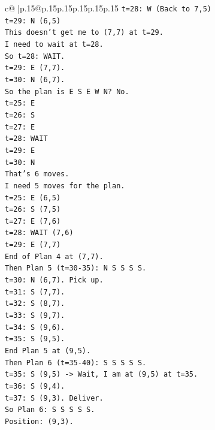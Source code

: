 \documentclass{article}
\begin{document}
{\begin{supertabular}{c@{$\;$}|p{.15\linewidth}@{}p{.15\linewidth}p{.15\linewidth}p{.15\linewidth}p{.15\linewidth}p{.15\linewidth}}
{{{\texttt{t=28: W (Back to 7,5)} \\
\texttt{t=29: N (6,5)} \\
\texttt{This doesn't get me to (7,7) at t=29.} \\
\texttt{I need to wait at t=28.} \\
\texttt{So t=28: WAIT.} \\
\texttt{t=29: E (7,7).} \\
\texttt{t=30: N (6,7).} \\
\texttt{So the plan is E S E W N? No.} \\
\texttt{t=25: E} \\
\texttt{t=26: S} \\
\texttt{t=27: E} \\
\texttt{t=28: WAIT} \\
\texttt{t=29: E} \\
\texttt{t=30: N} \\
\texttt{That's 6 moves.} \\
\texttt{I need 5 moves for the plan.} \\
\texttt{t=25: E (6,5)} \\
\texttt{t=26: S (7,5)} \\
\texttt{t=27: E (7,6)} \\
\texttt{t=28: WAIT (7,6)} \\
\texttt{t=29: E (7,7)} \\
\texttt{End of Plan 4 at (7,7).} \\
\texttt{Then Plan 5 (t=30{-}35): N S S S S.} \\
\texttt{t=30: N (6,7). Pick up.} \\
\texttt{t=31: S (7,7).} \\
\texttt{t=32: S (8,7).} \\
\texttt{t=33: S (9,7).} \\
\texttt{t=34: S (9,6).} \\
\texttt{t=35: S (9,5).} \\
\texttt{End Plan 5 at (9,5).} \\
\texttt{Then Plan 6 (t=35{-}40): S S S S S.} \\
\texttt{t=35: S (9,5) {-}> Wait, I am at (9,5) at t=35.} \\
\texttt{t=36: S (9,4).} \\
\texttt{t=37: S (9,3). Deliver.} \\
\texttt{So Plan 6: S S S S S.} \\
\texttt{Position: (9,3).} \\
\\ 
}}}
\end{supertabular}}
\end{document}

